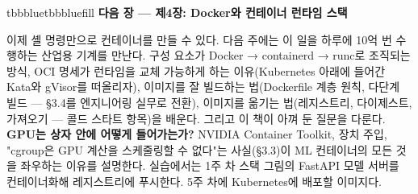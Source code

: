 \vspace{5.0pt}

\begin{calloutbox}{tbbblue}{tbbbluefill}
{\normalsize\bfseries\color{tbbblue}다음 장 — 제4장: Docker와 컨테이너 런타임 스택}\par\vspace{3pt}
이제 셸 명령만으로 컨테이너를 만들 수 있다. 다음 주에는 이 일을 하루에 10억 번 수행하는 산업용 기계를 만난다. 구성 요소가 Docker → containerd → runc로 조직되는 방식, OCI 명세가 런타임을 교체 가능하게 하는 이유(Kubernetes 아래에 들어간 Kata와 gVisor를 떠올리자), 이미지를 잘 빌드하는 법(Dockerfile 계층 원칙, 다단계 빌드 — §3.4를 엔지니어링 실무로 전환), 이미지를 옮기는 법(레지스트리, 다이제스트, 가져오기 — 콜드 스타트 항목)을 배운다. 그리고 이 책이 아껴 둔 질문을 다룬다. \textbf{GPU는 상자 안에 어떻게 들어가는가?} NVIDIA Container Toolkit, 장치 주입, "cgroup은 GPU 계산을 스케줄링할 수 없다"는 사실(§3.3)이 ML 컨테이너의 모든 것을 좌우하는 이유를 설명한다. 실습에서는 1주 차 스택 그림의 FastAPI 모델 서버를 컨테이너화해 레지스트리에 푸시한다. 5주 차에 Kubernetes에 배포할 이미지다.
\end{calloutbox}

